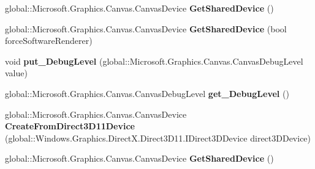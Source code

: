 \begin{DoxyCompactItemize}
\item 
\mbox{\label{interface_microsoft_1_1_graphics_1_1_canvas_1_1_i_canvas_device_statics_a980677dde098e69b5c096e2e2533711e}} 
global\+::\+Microsoft.\+Graphics.\+Canvas.\+Canvas\+Device {\bfseries Get\+Shared\+Device} ()
\item 
\mbox{\label{interface_microsoft_1_1_graphics_1_1_canvas_1_1_i_canvas_device_statics_a80dff67885dd4f6bc9a02d62a3ed0e5b}} 
global\+::\+Microsoft.\+Graphics.\+Canvas.\+Canvas\+Device {\bfseries Get\+Shared\+Device} (bool force\+Software\+Renderer)
\item 
\mbox{\label{interface_microsoft_1_1_graphics_1_1_canvas_1_1_i_canvas_device_statics_ad0fd3fa78db03abbc15b048622448383}} 
void {\bfseries put\+\_\+\+Debug\+Level} (global\+::\+Microsoft.\+Graphics.\+Canvas.\+Canvas\+Debug\+Level value)
\item 
\mbox{\label{interface_microsoft_1_1_graphics_1_1_canvas_1_1_i_canvas_device_statics_a87a1ee33571fda0a663fd8a722d12f18}} 
global\+::\+Microsoft.\+Graphics.\+Canvas.\+Canvas\+Debug\+Level {\bfseries get\+\_\+\+Debug\+Level} ()
\item 
\mbox{\label{interface_microsoft_1_1_graphics_1_1_canvas_1_1_i_canvas_device_statics_aa4908871d26502b4e2767051688362b6}} 
global\+::\+Microsoft.\+Graphics.\+Canvas.\+Canvas\+Device {\bfseries Create\+From\+Direct3\+D11\+Device} (global\+::\+Windows.\+Graphics.\+Direct\+X.\+Direct3\+D11.\+I\+Direct3\+D\+Device direct3\+D\+Device)
\item 
\mbox{\label{interface_microsoft_1_1_graphics_1_1_canvas_1_1_i_canvas_device_statics_a980677dde098e69b5c096e2e2533711e}} 
global\+::\+Microsoft.\+Graphics.\+Canvas.\+Canvas\+Device {\bfseries Get\+Shared\+Device} ()
\item 
\mbox{\label{interface_microsoft_1_1_graphics_1_1_canvas_1_1_i_canvas_device_statics_a80dff67885dd4f6bc9a02d62a3ed0e5b}} 

\end{DoxyCompactItemize}
